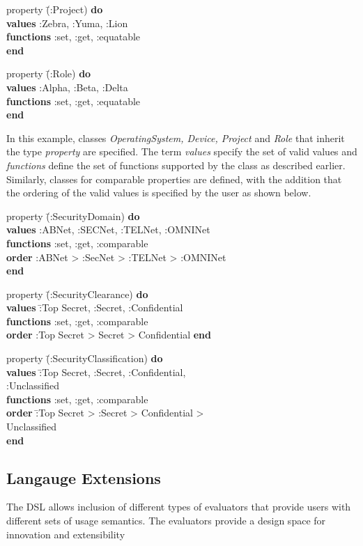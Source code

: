 \begin{tabbing}
property \= (:Project) {\bf do} \\
\>	 {\bf values}  :Zebra, :Yuma, :Lion\\
\>	 {\bf functions} :set, :get, :equatable \\
	 {\bf end}
\end{tabbing}

\begin{tabbing}	
 property  \= (:Role) {\bf do} \\
\>	 {\bf values} :Alpha, :Beta, :Delta\\
\>	 {\bf functions}  :set, :get, :equatable \\
	 {\bf end}
\end{tabbing}
	
In this example, classes  {\em OperatingSystem, Device, Project} and {\em Role} that inherit the type {\em property} are specified. The term {\em values} specify the set of valid values and {\em functions} define the set of functions supported by the class as described earlier. Similarly, classes for comparable properties are defined, with the addition that the ordering of the valid values is specified by the user as shown below. 

\begin{tabbing}
             property \= (:SecurityDomain) {\bf do} \\
\>	   {\bf values}  :ABNet, :SECNet, :TELNet, :OMNINet\\
\>	   {\bf functions}   :set, :get, :comparable \\
\>	   {\bf order} :ABNet > :SecNet > :TELNet > :OMNINet\\
	{\bf end} 
\end{tabbing}
	
\begin{tabbing}
 property \= (:SecurityClearance) {\bf do} \\
\>	 {\bf values} \= :Top Secret, :Secret, :Confidential \\
\>	 {\bf functions}  :set, :get, :comparable \\
\>       {\bf order} :Top Secret > Secret > Confidential
	 {\bf end}
\end{tabbing}

\begin{tabbing}
property \= (:SecurityClassification) {\bf do} \\
\>	 {\bf values} \=  :Top Secret, :Secret, :Confidential, \\
\>\>                               :Unclassified\\
\>	 {\bf functions} :set, :get, :comparable \\
\>       {\bf order} \= :Top Secret > :Secret > Confidential > \\
\>\>                           Unclassified\\
	 {\bf end}
\end{tabbing}







\subsection{Langauge Extensions}

The DSL allows inclusion of different types of evaluators that provide users with different sets of usage semantics. The evaluators provide a design space for innovation and extensibility




